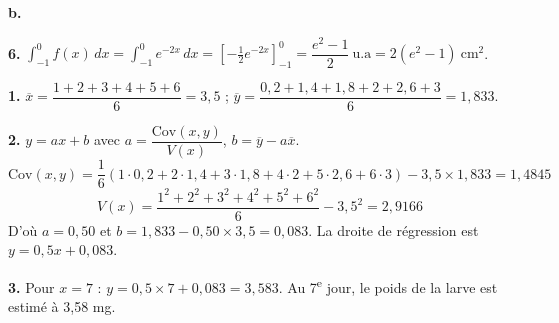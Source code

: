 \documentclass[11pt]{article}
\begin{document}
\textbf{b.}
\begin{center}
\end{center}

\textbf{6.} $\displaystyle\int_{-1}^0 f(x)\,dx = \int_{-1}^0 e^{-2x}\,dx = \left[-\tfrac{1}{2}e^{-2x}\right]_{-1}^0 = \dfrac{e^2 - 1}{2}\ \text{u.a} = 2(e^2 - 1)\ \text{cm}^2$.

\textbf{1.} $\overline{x} = \dfrac{1+2+3+4+5+6}{6} = 3{,}5$ ; \quad $\overline{y} = \dfrac{0{,}2 + 1{,}4 + 1{,}8 + 2 + 2{,}6 + 3}{6} = 1{,}833$.

\textbf{2.} $y = ax + b$ avec $a = \dfrac{\mathrm{Cov}(x,y)}{V(x)}$, $b = \overline{y} - a\overline{x}$.
\[ \mathrm{Cov}(x,y) = \frac{1}{6}(1\cdot 0{,}2 + 2\cdot 1{,}4 + 3\cdot 1{,}8 + 4\cdot 2 + 5\cdot 2{,}6 + 6\cdot 3) - 3{,}5\times 1{,}833 = 1{,}4845 \]
\[ V(x) = \frac{1^2 + 2^2 + 3^2 + 4^2 + 5^2 + 6^2}{6} - 3{,}5^2 = 2{,}9166 \]
D'où $a = 0{,}50$ et $b = 1{,}833 - 0{,}50\times 3{,}5 = 0{,}083$. La droite de régression est $y = 0{,}5x + 0{,}083$.

\textbf{3.} Pour $x = 7$ : $y = 0{,}5\times 7 + 0{,}083 = 3{,}583$. Au 7\textsuperscript{e} jour, le poids de la larve est estimé à 3,58 mg.
\end{document}

